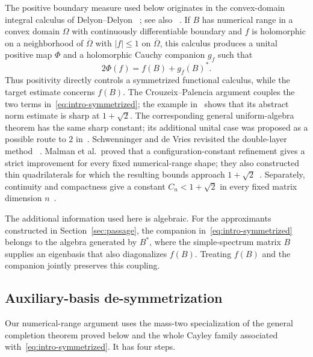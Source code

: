 \documentclass[preprints,article,submit,oneauthor]{Definitions/mdpi}
\theoremstyle{mdpi}
\theoremstyle{definition}
\begin{document}
The positive boundary measure used below originates in the
convex-domain integral calculus of Delyon--Delyon~%
\cite{DelyonDelyon1999}; see also~%
\cite{BadeaCrouzeixDelyon2006,CrouzeixPalencia2017}.  If $B$ has
numerical range in a convex domain $\Omega$ with continuously
differentiable boundary and $f$ is holomorphic on a neighborhood of
$\overline\Omega$ with $\lvert f\rvert\leq1$ on $\overline\Omega$, this
calculus produces a unital positive map $\Phi$ and a holomorphic Cauchy
companion $g_f$ such that
\begin{equation}
  2\Phi(f)=f(B)+g_f(B)^*.
  \label{eq:intro-symmetrized}
\end{equation}
Thus positivity directly controls a symmetrized functional calculus,
while the target estimate concerns $f(B)$.  The
Crouzeix--Palencia argument couples the two terms
in~\eqref{eq:intro-symmetrized}; the example
in~\cite{RansfordSchwenninger2018} shows that its abstract norm estimate
is sharp at $1+\sqrt2$.  The corresponding general uniform-algebra
theorem has the same sharp constant; its additional unital case was
proposed as a possible route to $2$
in~\cite{ClouatreOstermannRansford2023}.
Schwenninger and de Vries revisited the double-layer method~%
\cite{SchwenningerDeVries2025}.  Malman et al.\ proved that a
configuration-constant refinement gives a strict improvement for every
fixed numerical-range shape; they also constructed thin quadrilaterals
for which the resulting bounds approach
$1+\sqrt2$~\cite{MalmanEtAl2025}.
Separately,
continuity and compactness give a constant $C_n<1+\sqrt2$ in every
fixed matrix dimension $n$~\cite{MalmanRatio2024}.

The additional information used here is algebraic.  For the approximants
constructed in Section~\ref{sec:passage}, the companion
in~\eqref{eq:intro-symmetrized} belongs to the algebra generated by
$B^*$, where the simple-spectrum matrix $B$ supplies an eigenbasis that
also diagonalizes $f(B)$.  Treating $f(B)$ and the companion jointly
preserves this coupling.

\subsection{Auxiliary-basis de-symmetrization}

Our numerical-range argument uses the mass-two specialization of the
general completion theorem proved below and the whole Cayley family
associated with~\eqref{eq:intro-symmetrized}.  It has four steps.
\end{document}
